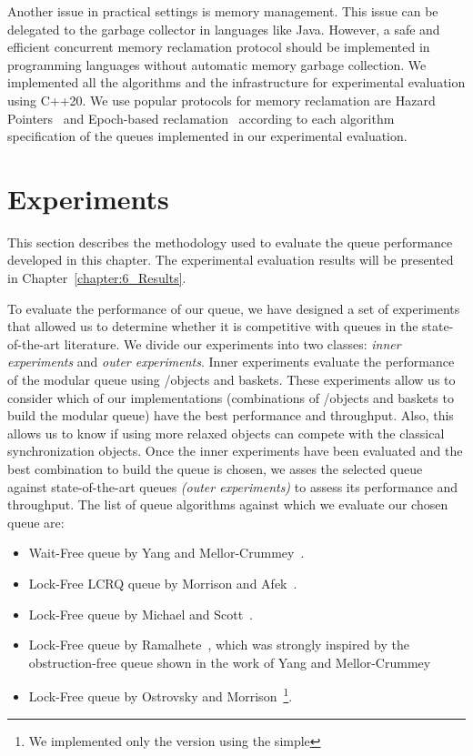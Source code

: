 Another issue in practical settings is memory management. This issue can be delegated to the garbage collector in languages like Java. However, a safe and efficient concurrent memory reclamation protocol should be implemented in programming languages without automatic memory garbage collection. We implemented all the algorithms and the infrastructure for experimental evaluation using C++20. We use popular protocols for memory reclamation are Hazard Pointers~\cite{DBLP_conf_podc_Michael02} and Epoch-based reclamation~\cite{DBLP_phd_ethos_Fraser04,mckenney2001read} according to each algorithm specification of the queues implemented in our experimental evaluation.




\section{\label{sec:queue-experiments}Experiments}

This section describes the methodology used to evaluate the queue performance developed in this chapter. The experimental evaluation results will be presented in Chapter~\ref{chapter:6_Results}.

To evaluate the performance of our queue, we have designed a set of experiments that allowed us to determine whether it is competitive with queues in the state-of-the-art literature.
We divide our experiments into two classes: \emph{inner experiments} and \emph{outer experiments}.
Inner experiments evaluate the performance of the modular queue using \LL/\IC objects and baskets. These experiments allow us to consider which of our implementations (combinations of \LL/\IC objects and baskets to build the modular queue) have the best performance and throughput. Also, this allows us to know if using more relaxed objects can compete with the classical synchronization objects. Once the inner experiments have been evaluated and the best combination to build the queue is chosen, we asses the selected queue against state-of-the-art queues \emph{(outer experiments)} to assess its performance and throughput. The list of queue
algorithms against which we evaluate our chosen queue are:

\begin{itemize}
    \item Wait-Free queue by Yang and Mellor-Crummey~\cite{DBLP_conf_ppopp_YangM16}.
    \item Lock-Free LCRQ queue by Morrison and Afek~\cite{ppopp2013x86queues}.
    \item Lock-Free queue by Michael and Scott~\cite{DBLP_conf_podc_MichaelS96}.
    \item Lock-Free queue by Ramalhete~\cite{Ramalhete_Correia_MPMC_2016}, which was strongly inspired by the obstruction\hyp{}free queue shown in the work of Yang and Mellor-Crummey~\cite{DBLP_conf_ppopp_YangM16}
    \item Lock-Free queue by Ostrovsky and Morrison~\cite{scalingconcurrent2020}\footnote{We implemented only the version using the simple \CAS}.
\end{itemize}

